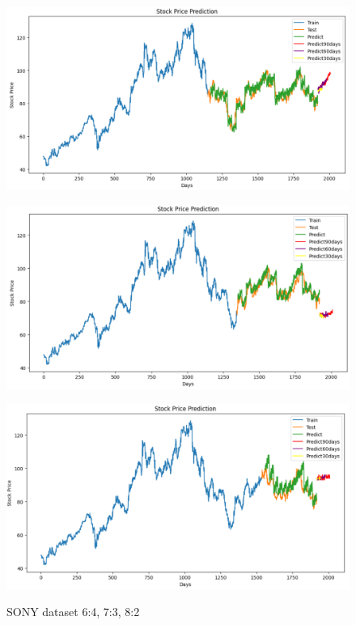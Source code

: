 \documentclass[conference]{IEEEtran}
\begin{document}
\begin{figure}[H]
    \centering
    \begin{minipage}{0.15\textwidth}
    \centering
    \includegraphics[width=1\textwidth]{Image/NBeat/N_BEAT_SONY_6_4.png}
   
    \label{fig:1}
    \end{minipage}%
    \begin{minipage}{0.15\textwidth}
    \centering
    \includegraphics[width=1\textwidth]{Image/NBeat/N_BEAT_SONY_7_3.png}
  
    \label{fig:2}
    \end{minipage}%
    \begin{minipage}{0.15\textwidth}
    \centering
    \includegraphics[width=1\textwidth]{Image/NBeat/N_BEAT_SONY_8_2.png}

    \label{fig:3}
    \end{minipage}
    \caption{SONY dataset 6:4, 7:3, 8:2}
\end{figure}
\end{document}
